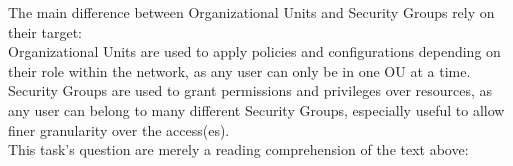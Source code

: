 {The main difference between Organizational Units and Security Groups rely on their target:\\
Organizational Units are used to apply policies and configurations depending on their role within the network, as any user can only be in one OU at a time. \\
Security Groups are used to grant permissions and privileges over resources, as any user can belong to many different Security Groups, especially useful to allow finer granularity over the access(es).\\

This task's question are merely a reading comprehension of the text above:
}
